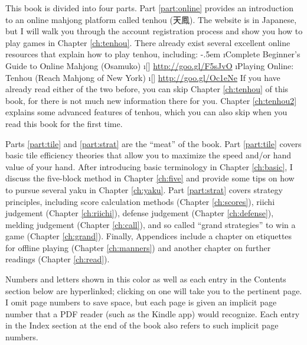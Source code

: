 \bigskip

This book is divided into four parts. Part \ref{part:online} provides an introduction to an online mahjong platform called {\jap tenhou} (天鳳). The website is in Japanese, but I will walk you through the account registration process and show you how to play games in Chapter \ref{ch:tenhou}. There already exist several excellent online resources that explain how to play {\jap tenhou}, including:
\bi \itemsep-.5em
\i Complete Beginner's Guide to Online Mahjong (Osamuko)
\vspace{-10pt} 
	\bi
	\i[] \url{http://goo.gl/F5sJvO}
	\ei
\i Playing Online: Tenhou (Reach Mahjong of New York)
	\bi \i[] \url{http://goo.gl/Oc1eNe} \ei
\ei
If you have already read either of the two before, you can skip Chapter \ref{ch:tenhou} of this book, for there is not much new information there for you. Chapter \ref{ch:tenhou2} explains some advanced features of {\jap tenhou}, which you can also skip when you read this book for the first time.

\bigskip
Parts \ref{part:tile} and \ref{part:strat} are the ``meat'' of the book. 
Part \ref{part:tile} covers basic tile efficiency theories that allow you to maximize the speed and/or hand value of your hand. After introducing basic terminology in Chapter \ref{ch:basic}, I discuss the five-block method in Chapter \ref{ch:five} and provide some tips on how to pursue several {\jap yaku} in Chapter \ref{ch:yaku}. 
Part \ref{part:strat} covers strategy principles, including score calculation methods (Chapter \ref{ch:scores}), {\jap riichi} judgement (Chapter \ref{ch:riichi}), defense judgement (Chapter \ref{ch:defense}), melding judgement (Chapter \ref{ch:call}), and so called ``grand strategies'' to win a game (Chapter \ref{ch:grand}). 
Finally, Appendices include a chapter on etiquettes for offline playing (Chapter \ref{ch:manners}) and another chapter on further readings (Chapter \ref{ch:read}). 

\bigskip
Numbers and letters shown {\color{MyBlue} in this color} as well as each entry in the Contents section below are hyperlinked; clicking on one will take you to the pertinent page. I omit page numbers to save space, but each page is given an implicit page number that a PDF reader (such as the Kindle app) would recognize. Each entry in the Index section at the end of the book also refers to such implicit page numbers. 


